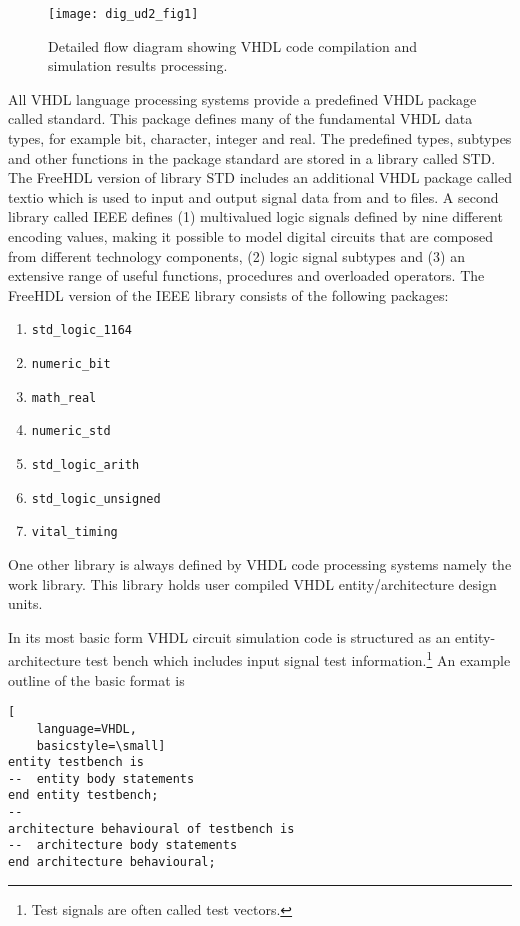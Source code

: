 \FloatBarrier
\begin{figure}[ht]
  \centering
  \texttt{[image: dig\_ud2\_fig1]} 
  \caption{Detailed flow diagram showing VHDL code compilation and simulation results processing.}
  \label{fig:ud2_fig1}
\end{figure} 
\FloatBarrier



All VHDL language processing systems provide a predefined VHDL package called standard.  This package defines many of the fundamental VHDL data types, for example bit, character, integer and real. The predefined types, subtypes and other functions in the package standard are stored in a library called STD. The FreeHDL version of library STD includes an additional VHDL package called textio which is used to input and output signal data from and to files.  A second library called IEEE defines (1) multivalued logic signals defined by nine different encoding values, making it possible to model digital circuits that are composed from different technology components, (2) logic signal subtypes and (3) an extensive range of useful functions, procedures and overloaded operators.  The FreeHDL version of the IEEE library consists of the following packages:
\begin{enumerate}
\item \verb|std_logic_1164|
\item \verb|numeric_bit|
\item \verb|math_real|
\item \verb|numeric_std|
\item \verb|std_logic_arith|
\item \verb|std_logic_unsigned|
\item \verb|vital_timing|
\end{enumerate}

One other library is always defined by VHDL code processing systems namely the work library.  This library holds user compiled VHDL entity/architecture design units.


In its most basic form VHDL circuit simulation code is structured as an entity-architecture test bench which includes input signal test information.\footnote{Test signals are often called test vectors.} An example outline of the basic format is 

\begin{lstlisting}[
    language=VHDL,
    basicstyle=\small]
entity testbench is
--  entity body statements
end entity testbench;
--
architecture behavioural of testbench is
--  architecture body statements
end architecture behavioural;
\end{lstlisting}

